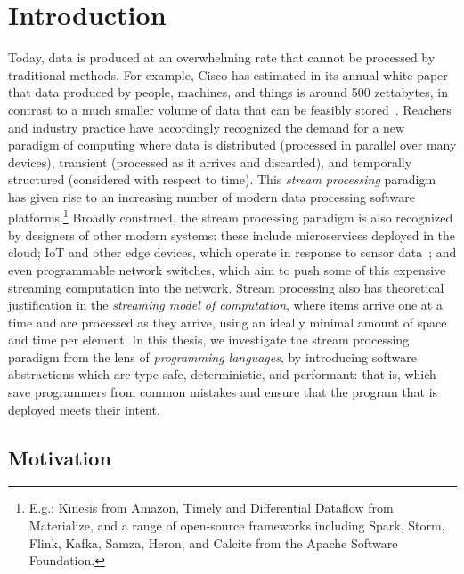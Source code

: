 \chapter{Introduction}
\label{cha:intro}

Today, data is produced at an overwhelming rate
that cannot be processed by traditional methods.
For example, Cisco has estimated in its annual white paper
that data produced by people, machines, and things
is around 500 zettabytes, in contrast to a much smaller volume
of data that can be feasibly stored~\cite{index2018forecast}.
Reachers and industry practice have accordingly recognized the demand
for a new paradigm of computing where data is
distributed (processed in parallel over many devices),
transient (processed as it arrives and discarded),
and temporally structured (considered with respect to time).
This \emph{stream processing} paradigm has given rise to an increasing number
of modern data processing software platforms.\footnote{E.g.: Kinesis from Amazon, Timely and Differential Dataflow from Materialize, and a range of open-source frameworks including Spark, Storm, Flink, Kafka, Samza, Heron, and Calcite from the Apache Software Foundation.}
Broadly construed, the stream processing paradigm is also recognized by designers of other modern systems: these include microservices deployed in the cloud; IoT and other edge devices, which operate in response
to sensor data~\cite{shi2016edge, ashton2009internet}; and even programmable network switches,
which aim to push some of this expensive streaming computation
into the network.
Stream processing also has theoretical justification in the \emph{streaming model of computation},
where items arrive one at a time and are processed as they arrive, using
an ideally minimal amount of space and time per element.
In this thesis, we investigate the stream processing paradigm from the lens of \emph{programming languages}, by introducing software abstractions which are type-safe, deterministic, and performant: that is, which save programmers from common mistakes and ensure that the program that is deployed meets their intent.

\section{Motivation}

